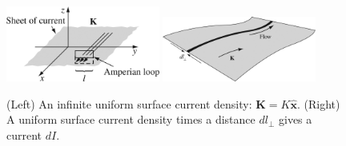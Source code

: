 \documentclass[12pt]{article}
\begin{document}
\begin{figure}
\centering
\includegraphics[width=0.45\textwidth]{figures/5_33.jpg}
\includegraphics[width=0.45\textwidth]{figures/5_13.jpg}
\caption{\label{fig:1} (Left) An infinite uniform surface current density: $\mathbf{K} = K\hat{\mathbf{x}}$. (Right) A uniform surface current density times a distance $dl_{\perp}$ gives a current $dI$.}
\end{figure}
\end{document}
